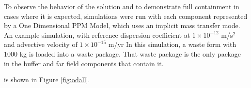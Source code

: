 To observe the behavior of the solution and to demonstrate full containment in 
cases where it is expected, simulations were run with each component represented 
by a One Dimensional PPM Model, which uses an implicit mass transfer mode. An 
example simulation, with reference dispersion coefficient at $1\times 10^{-12}$ 
m/s$^2$ and advective velocity of $1\times 10^{-15}$ m/yr 
In this simulation, a waste form with 1000 kg 
is loaded into a waste package. That waste package is the only package in the 
buffer and far field components that contain it.


\FloatBarrier
is shown in Figure \ref{fig:odall}. 
